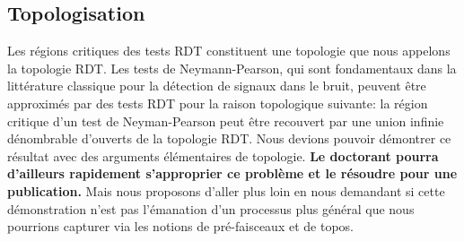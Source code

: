 \documentclass[a4paper, 10pt]{article}
\begin{document}
\subsection{Topologisation}

Les régions critiques des tests RDT constituent une topologie que nous appelons la topologie RDT. Les tests de Neymann-Pearson, qui sont fondamentaux dans la littérature classique pour la détection de signaux dans le bruit, peuvent être approximés par des tests RDT pour la raison topologique suivante: la région critique d'un test de Neyman-Pearson peut être recouvert par une union infinie dénombrable d'ouverts de la topologie RDT. Nous devions pouvoir démontrer ce résultat avec des arguments élémentaires de topologie. \textbf{Le doctorant pourra d'ailleurs rapidement s'approprier ce problème et le résoudre pour une publication.} Mais nous proposons d'aller plus loin en nous demandant si cette démonstration n'est pas l'émanation d'un processus plus général que nous pourrions capturer via les notions de pré-faisceaux et de topos.
\end{document}
